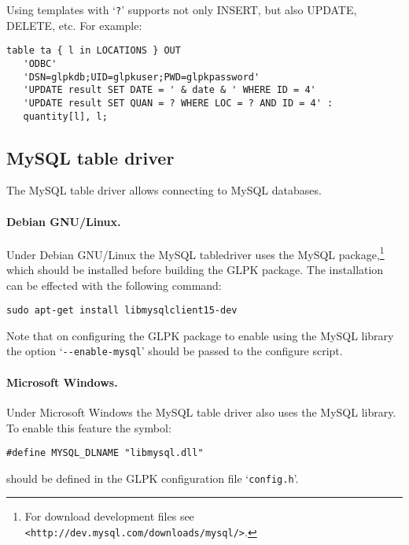 \documentclass[11pt,draft]{article}
\begin{document}
Using templates with `\verb|?|' supports not only INSERT, but also
UPDATE, DELETE, etc. For example:

\begin{small}
\begin{verbatim}
table ta { l in LOCATIONS } OUT
   'ODBC'
   'DSN=glpkdb;UID=glpkuser;PWD=glpkpassword'
   'UPDATE result SET DATE = ' & date & ' WHERE ID = 4'
   'UPDATE result SET QUAN = ? WHERE LOC = ? AND ID = 4' :
   quantity[l], l;
\end{verbatim}
\end{small}

\subsection*{MySQL table driver}

The MySQL table driver allows connecting to MySQL databases.

\paragraph{Debian GNU/Linux.}
Under Debian GNU/Linux the MySQL table\linebreak driver uses the MySQL
package,\footnote{For download development files see
{\tt<http://dev.mysql.com/downloads/mysql/>}.} which should be installed
before building the GLPK package. The installation can be effected with
the following command:

\begin{verbatim}
sudo apt-get install libmysqlclient15-dev
\end{verbatim}

Note that on configuring the GLPK package to enable using the MySQL
library the option `\verb|--enable-mysql|' should be passed to the
configure script.

\pagebreak

\paragraph{Microsoft Windows.}
Under Microsoft Windows the MySQL table driver also uses the MySQL
library. To enable this feature the symbol:

\begin{verbatim}
#define MYSQL_DLNAME "libmysql.dll"
\end{verbatim}

\noindent
should be defined in the GLPK configuration file `\verb|config.h|'.
\end{document}
